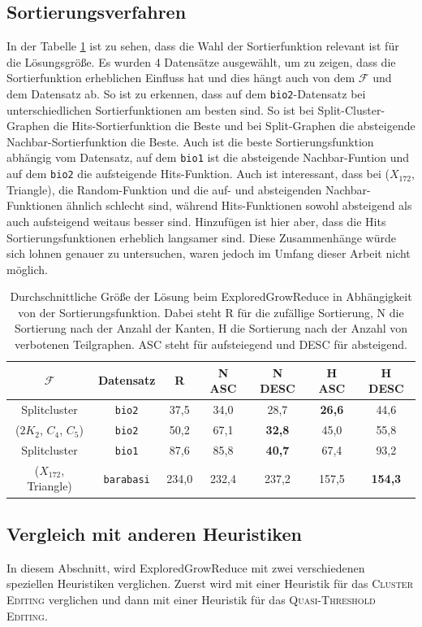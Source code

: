 \documentclass[12pt,a4paper,onecolumn,oneside,titlepage]{article}
\newcommand{\vars}{\texttt}
\newcommand\cursive[1]{\ensuremath{\mathcal{#1}}}
\begin{document}
\subsection{Sortierungsverfahren}
In der Tabelle \ref{tab:sort} ist zu sehen, dass die Wahl der Sortierfunktion relevant ist für die Lösungsgröße. Es wurden 4 Datensätze ausgewählt, um zu zeigen, dass die Sortierfunktion erheblichen Einfluss hat und dies hängt auch von dem \cursive{F} und dem Datensatz ab. 
So ist zu erkennen, dass auf dem \vars{bio2}-Datensatz bei unterschiedlichen Sortierfunktionen am besten sind. So ist bei Split-Cluster-Graphen die Hits-Sortierfunktion die Beste und bei Split-Graphen die absteigende Nachbar-Sortierfunktion die Beste.
Auch ist die beste Sortierungsfunktion abhängig vom Datensatz, auf dem \vars{bio1} ist die absteigende Nachbar-Funtion und auf dem \vars{bio2} die aufsteigende Hits-Funktion.
Auch ist interessant, dass bei ($X_{172}$, Triangle), die Random-Funktion und die auf- und absteigenden Nachbar-Funktionen ähnlich schlecht sind, während Hits-Funktionen sowohl absteigend als auch aufsteigend weitaus besser sind.
Hinzufügen ist hier aber, dass die Hits Sortierungsfunktionen erheblich langsamer sind.
Diese Zusammenhänge würde sich lohnen genauer zu untersuchen, waren jedoch im Umfang dieser Arbeit nicht möglich. 
\begin{table}
\centering
\small
\begin{tabular}{cc|ccccc}
\cursive{F} & Datensatz & R & N ASC & N DESC & H ASC & H DESC   \\ 
\hline 
Splitcluster & \vars{bio2} & 37,5 & 34,0 & 28,7 & \textbf{26,6} & 44,6 \\
($2K_2$, $C_4$, $C_5$) & \vars{bio2} & 50,2 & 67,1 & \textbf{32,8} & 45,0 & 55,8 \\
Splitcluster & \vars{bio1} & 87,6 & 85,8 & \textbf{40,7} & 67,4 & 93,2 \\
($X_{172}$, Triangle) & \vars{barabasi} & 234,0 & 232,4 & 237,2 & 157,5 & \textbf{154,3} \\
\end{tabular} 
\caption{Durchschnittliche Größe der Lösung beim ExploredGrowReduce in Abhängigkeit von der Sortierungsfunktion. Dabei steht R für die zufällige Sortierung, N die Sortierung nach der Anzahl der Kanten, H die Sortierung nach der Anzahl von verbotenen Teilgraphen. ASC steht für aufsteiegend und DESC für absteigend. }
\label{tab:sort}
\end{table}


\subsection{Vergleich mit anderen Heuristiken}
In diesem Abschnitt, wird ExploredGrowReduce mit zwei verschiedenen speziellen Heuristiken verglichen. Zuerst wird mit einer Heuristik für das \textsc{Cluster Editing} verglichen und dann mit einer Heuristik für das \textsc{Quasi-Threshold Editing}.
\end{document}
